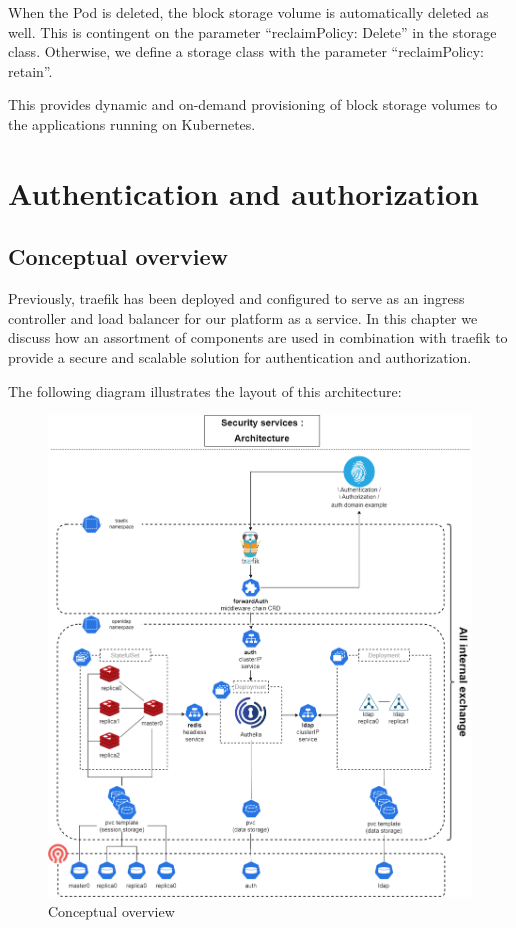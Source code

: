 When the Pod is deleted, the block storage volume is automatically deleted as well. This is contingent on the parameter “reclaimPolicy: Delete” in the storage class. Otherwise, we define a storage class with the parameter “reclaimPolicy: retain”. 

This provides dynamic and on-demand provisioning of block storage volumes to the applications running on Kubernetes.

\section{Authentication and authorization}
\subsection{Conceptual overview }

Previously, traefik has been deployed and configured to serve as an ingress controller and load balancer for our platform as a service. In this chapter we discuss how an assortment of components are used in combination with traefik to provide a secure and scalable solution for authentication and authorization. 

The following diagram illustrates the layout of this architecture: 

\begin{figure}[H]\centering
\includegraphics[width=1.0\textwidth,angle=00]{assets/f51.png}
\caption{Conceptual overview }
\label{fig:f51}
\end{figure}

